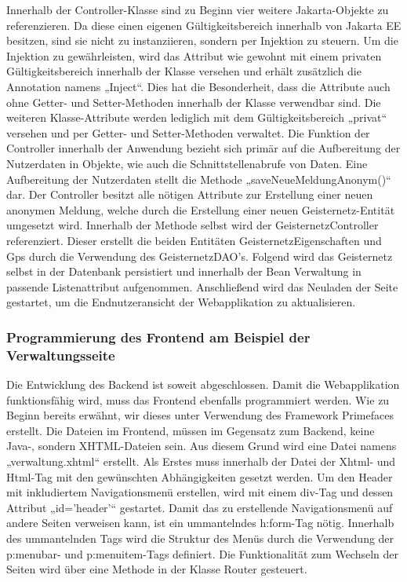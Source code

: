 \documentclass[11pt]{article}
\begin{document}
    \newpage
    Innerhalb der Controller-Klasse sind zu Beginn vier weitere Jakarta-Objekte zu referenzieren. Da diese einen eigenen Gültigkeitsbereich innerhalb von Jakarta EE besitzen, sind sie nicht zu instanziieren, sondern per Injektion zu steuern.
    Um die Injektion zu gewährleisten, wird das Attribut wie gewohnt mit einem privaten Gültigkeitsbereich innerhalb der Klasse versehen und erhält zusätzlich
    die Annotation namens „Inject“. Dies hat die Besonderheit, dass die Attribute auch ohne Getter- und Setter-Methoden innerhalb der Klasse verwendbar sind.
    Die weiteren Klasse-Attribute werden lediglich mit dem Gültigkeitsbereich „privat“ versehen und per Getter- und Setter-Methoden verwaltet.
    Die Funktion der Controller innerhalb der Anwendung bezieht sich primär auf die Aufbereitung der Nutzerdaten in Objekte, wie auch die Schnittstellenabrufe von Daten.
    Eine Aufbereitung der Nutzerdaten stellt die Methode „saveNeueMeldungAnonym()“ dar. Der Controller besitzt alle nötigen Attribute zur Erstellung einer neuen anonymen Meldung, welche durch die Erstellung einer neuen Geisternetz-Entität umgesetzt wird.
    Innerhalb der Methode selbst wird der GeisternetzController referenziert. Dieser erstellt die beiden Entitäten GeisternetzEigenschaften und Gps durch die Verwendung des GeisternetzDAO's. Folgend wird das Geisternetz selbst in der Datenbank 
    persistiert und innerhalb der Bean Verwaltung in passende Listenattribut aufgenommen. Anschließend wird das Neuladen der Seite gestartet, um die Endnutzeransicht der Webapplikation zu aktualisieren.
    
    \newpage
    \subsubsection{Programmierung des Frontend am Beispiel der Verwaltungsseite}
    Die Entwicklung des Backend ist soweit abgeschlossen. Damit die Webapplikation funktionsfähig wird, muss das Frontend ebenfalls programmiert werden.
    Wie zu Beginn bereits erwähnt, wir dieses unter Verwendung des Framework Primefaces erstellt.
    Die Dateien im Frontend, müssen im Gegensatz zum Backend, keine Java-, sondern XHTML-Dateien sein. Aus diesem Grund wird eine Datei namens „verwaltung.xhtml“ erstellt.
    Als Erstes muss innerhalb der Datei der Xhtml- und Html-Tag mit den gewünschten Abhängigkeiten gesetzt werden. Um den Header mit inkludiertem Navigationsmenü erstellen,
    wird mit einem div-Tag und dessen Attribut „id='header'“ gestartet. Damit das zu erstellende Navigationsmenü auf andere Seiten verweisen kann, ist ein ummantelndes h:form-Tag nötig. Innerhalb des ummantelnden Tags wird die Struktur des Menüs durch die Verwendung der 
    p:menubar- und p:menuitem-Tags definiert. Die Funktionalität zum Wechseln der Seiten wird über eine Methode in der Klasse Router gesteuert.
    
\end{document}
